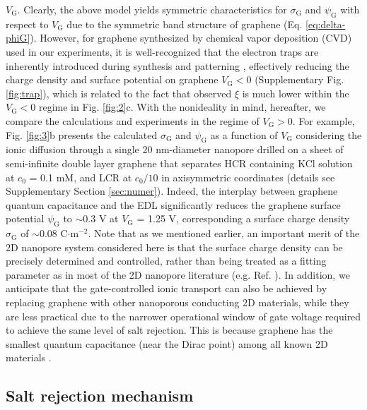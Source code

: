 \documentclass[journal=langd5,email=true, hyperref=true, keywords=false]{achemso}
\begin{document}
$V_{\mathrm{G}}$. Clearly, the above model yields symmetric
characteristics for $\sigma_{\mathrm{G}}$ and $\psi_{\mathrm{G}}$ with
respect to $V_{\mathrm{G}}$ due to the symmetric band structure of
graphene (Eq. \eqref{eq:delta-phiG}). However, for graphene
synthesized by chemical vapor deposition (CVD) used in our
experiments, it is well-recognized that the electron traps are
inherently introduced during synthesis and patterning
\cite{Dean_2010}, effectively reducing the charge density and surface
potential on graphene $V_{\mathrm{G}}<0$ (Supplementary Fig.
\ref{fig:trap}), which is related to the fact that observed $\xi$ is
much lower within the $V_{\mathrm{G}}<0$ regime in Fig.
\ref{fig:2}c. With the nonideality in mind, hereafter, we compare the
calculations and experiments in the regime of $V_{\mathrm{G}}>0$. For
example, Fig. \ref{fig:3}b presents the calculated
$\sigma_{\mathrm{G}}$ and $\psi_{\mathrm{G}}$ as a function of
$V_{\mathrm{G}}$ considering the ionic diffusion through a single 20
nm-diameter nanopore drilled on a sheet of semi-infinite double layer
graphene that separates HCR containing KCl solution at $c_{0}$ = 0.1
mM, and LCR at $c_{0}/10$ in axisymmetric coordinates (details see
Supplementary Section \ref{sec:numer}). Indeed, the interplay between
graphene quantum capacitance and the EDL significantly reduces the
graphene surface potential $\psi_{\mathrm{G}}$ to $\sim$0.3 V at
$V_{\mathrm{G}}$ = 1.25 V, corresponding a surface charge density
$\sigma_{\mathrm{G}}$ of $\sim$0.08 C$\cdot$m$^{-2}$. Note that as we
mentioned earlier, an important merit of the 2D nanopore system
considered here is that the surface charge density can be precisely
determined and controlled, rather than being treated as a fitting
parameter as in most of the 2D nanopore literature
(e.g. Ref. ). In addition, we anticipate that
the gate-controlled ionic transport can also be achieved by replacing
graphene with other nanoporous conducting 2D materials, while they are
less practical due to the narrower operational window of gate voltage
required to achieve the same level of salt rejection. This is because
graphene has the smallest quantum capacitance (near the Dirac point)
among all known 2D materials \cite{Tian_2016}.

\subsection*{Salt rejection mechanism}
\label{sec:mechanism}
\end{document}
